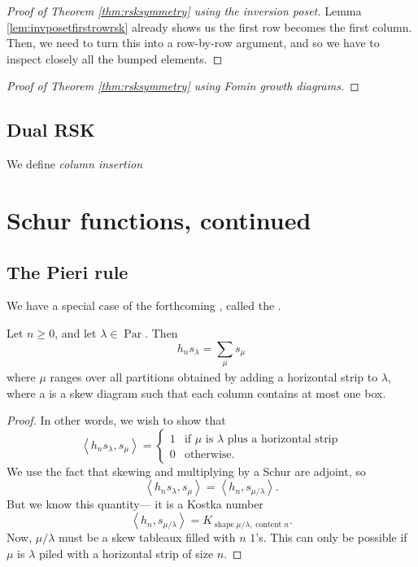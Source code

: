 \documentclass{article}
\newcommand{\InnerProduct}[1]{
    \ensuremath{
        \left\langle
            {#1}
        \right\rangle
    }
}
\DeclareMathOperator{\shape}{shape}
\DeclareMathOperator{\content}{content}
\DeclareMathOperator{\Par}{Par}
\begin{document}
\begin{proof}[Proof of Theorem \ref{thm:rsksymmetry} using the inversion poset]

    Lemma \ref{lem:invposetfirstrowrsk} already shows us the first row becomes the first column.
    Then, we need to turn this into a row-by-row argument, and so we have to inspect closely all the bumped elements.
    

\end{proof}

\begin{proof}[Proof of Theorem \ref{thm:rsksymmetry} using Fomin growth diagrams]
\end{proof}

\subsection{Dual RSK}

\begin{definition}
    We define \textit{column insertion}
\end{definition}

\section{Schur functions, continued}

\subsection{The Pieri rule}

We have a special case of the forthcoming , called the .

\begin{theorem}
    Let $n \geq 0$, and let $\lambda \in \Par$.
    Then
    \[
        h_ns_\lambda = \sum_{\substack{\mu}} s_\mu
    \]
    where $\mu$ ranges over all partitions obtained by adding a horizontal strip to $\lambda$, where a  is a skew diagram such that each column contains at most one box.
\end{theorem}

\begin{proof}
    In other words, we wish to show that
    \[
        \InnerProduct{h_ns_\lambda,s_\mu}
        =
        \begin{cases}
            1 & \text{if $\mu$ is $\lambda$ plus a horizontal strip} \\
            0 & \text{otherwise}.
        \end{cases}
    \]
    We use the fact that skewing and multiplying by a Schur are adjoint, so
    \[
        \InnerProduct{h_ns_\lambda,s_\mu}
        =
        \InnerProduct{h_n,s_{\mu/\lambda}}.
    \]
    But we know this quantity--- it is a Kostka number
    \[
        \InnerProduct{h_n,s_{\mu/\lambda}}
        =
        K_{\shape \mu/\lambda, \content n}.
    \]
    Now, $\mu / \lambda$ must be a skew tableaux filled with $n$ $1$'s.
    This can only be possible if $\mu$ is $\lambda$ piled with a horizontal strip of size $n$.
\end{proof}
\end{document}
